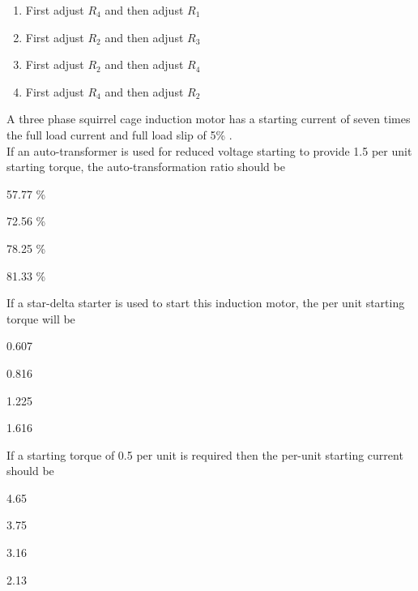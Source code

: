 		\begin{enumerate}
			\item First adjust $R_4$ and then adjust $R_1$
			\item First adjust $R_2$ and then adjust $R_3$
			\item First adjust $R_2$ and then adjust $R_4$
			\item First adjust $R_4$ and then adjust $R_2$
		\end{enumerate}	
	\item A three phase squirrel cage induction motor has a starting current of seven times the full load current and full load slip of 5\% . \\
	If an auto-transformer is used for reduced voltage starting to provide 1.5 per unit starting torque, the auto-transformation ratio \brak{\%} should be
		\begin{enumerate}
		\end{enumerate}
	\item If a star-delta starter is used to start this induction motor, the per unit starting torque will be
		\begin{enumerate}
				\begin{multicols}{4}
				\item 0.607
				\item 0.816
				\item 1.225
				\item 1.616
				\end{multicols}
		\end{enumerate}
	\item If a starting torque of 0.5 per unit is required then the per-unit starting current should be
		\begin{enumerate}
				\begin{multicols}{4}
				\item 4.65
				\item 3.75
				\item 3.16
				\item 2.13
				\end{multicols}
		\end{enumerate}

